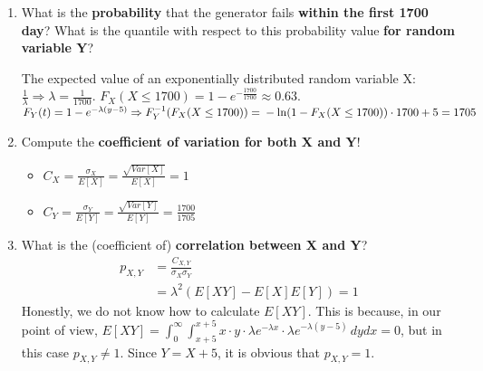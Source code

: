 \documentclass{homework}
\begin{document}
\begin{enumerate}[label=(\alph*)]
	\item What is the \textbf{probability} that the generator fails \textbf{within the first 1700 day}? What is the quantile with respect to this probability value \textbf{for random variable Y}?

	The expected value of an exponentially distributed random variable X: $\frac{1}{\lambda} \Rightarrow \lambda = \frac{1}{1700}$. $F_X(X\leq 1700) = 1 - e^{-\frac{1700}{1700}} \approx 0.63$. $F_Y(t) = 1 - e^{-\lambda(y-5)} \Rightarrow F^{-1}_Y(F_X(X\leq 1700)) = \newline -\ln(1 - F_X(X\leq 1700))\cdot 1700 + 5 = 1705$

	\item Compute the \textbf{coefficient of variation for both X and Y}!
		\begin{itemize}
			\item $C_X = \frac{\sigma_X}{E[X]} = \frac{\sqrt{Var[X]}}{E[X]} = 1$
			\item $C_Y = \frac{\sigma_Y}{E[Y]} = \frac{\sqrt{Var[Y]}}{E[Y]} = \frac{1700}{1705}$
		\end{itemize}
	\item What is the (coefficient of) \textbf{correlation between X and Y}?
	\begin{align*}
		p_{X,Y} &= \frac{C_{X,Y}}{\sigma_X \sigma_Y} \\
		&= \lambda^2(E[XY] - E[X]E[Y]) = 1
	\end{align*}
	Honestly, we do not know how to calculate $E[XY]$. This is because, in our point of view, $E[XY] = \int_0^\infty \int_{x+5}^{x+5} x\cdot y \cdot \lambda e^{-\lambda x} \cdot \lambda e^{-\lambda (y-5)}\,dydx = 0$, but in this case $p_{X,Y} \neq 1$. Since $Y = X + 5$, it is obvious that $p_{X,Y} = 1$.
\end{enumerate}
\end{document}
